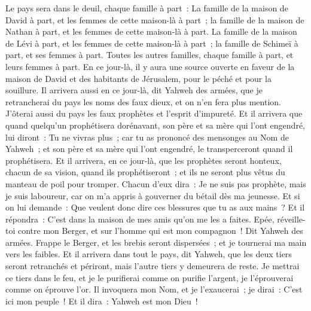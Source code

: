 \begin{multicols}{2}
Le pays sera dans le deuil, chaque famille à part~: La famille de la maison de David à part, et les femmes de cette maison-là à part~; la famille de la maison de Nathan à part, et les femmes de cette maison-là à part.
La famille de la maison de Lévi à part, et les femmes de cette maison-là à part~; la famille de Schimeï à part, et ses femmes à part.
Toutes les autres familles, chaque famille à part, et leurs femmes à part.
\VerseOne{}En ce jour-là, il y aura une source ouverte en faveur de la maison de David et des habitants de Jérusalem, pour le péché et pour la souillure.
Il arrivera aussi en ce jour-là, dit Yahweh des armées, que je retrancherai du pays les noms des faux dieux, et on n'en fera plus mention. J'ôterai aussi du pays les faux prophètes et l'esprit d'impureté.
Et il arrivera que quand quelqu'un prophétisera dorénavant, son père et sa mère qui l'ont engendré, lui diront~: Tu ne vivras plus~; car tu as prononcé des mensonges au Nom de Yahweh~; et son père et sa mère qui l'ont engendré, le transperceront quand il prophétisera.
Et il arrivera, en ce jour-là, que les prophètes seront honteux, chacun de sa vision, quand ils prophétiseront~; et ils ne seront plus vêtus du manteau de poil pour tromper.
Chacun d'eux dira~: Je ne suis pas prophète, mais je suis laboureur, car on m'a appris à gouverner du bétail dès ma jeunesse.
Et si on lui demande~: Que veulent donc dire ces blessures que tu as aux mains~? Et il répondra~: C'est dans la maison de mes amis qu'on me les a faites.
Epée, réveille-toi contre mon Berger, et sur l'homme qui est mon compagnon~! Dit Yahweh des armées. Frappe le Berger, et les brebis seront dispersées~; et je tournerai ma main vers les faibles.
Et il arrivera dans tout le pays, dit Yahweh, que les deux tiers seront retranchés et périront, mais l'autre tiers y demeurera de reste.
Je mettrai ce tiers dans le feu, et je le purifierai comme on purifie l'argent, je l'éprouverai comme on éprouve l'or. Il invoquera mon Nom, et je l'exaucerai~; je dirai~: C'est ici mon peuple~! Et il dira~: Yahweh est mon Dieu~!

\end{multicols}
